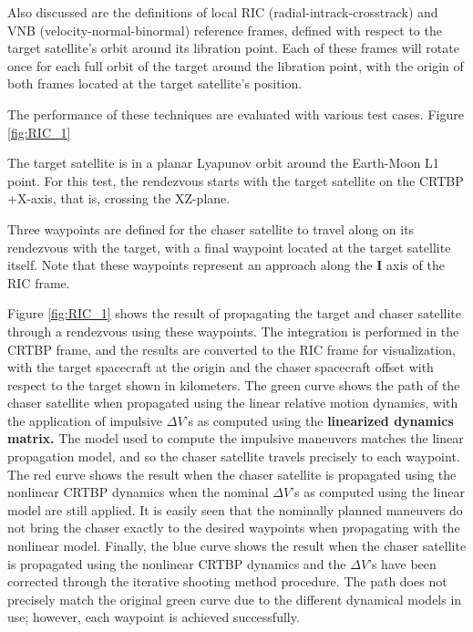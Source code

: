 \documentclass[a4paper]{article}
\begin{document}
Also discussed are the definitions of local RIC (radial-intrack-crosstrack) and VNB (velocity-normal-binormal) reference frames, defined with respect to the target satellite's orbit around its libration point.  Each of these frames will rotate once for each full orbit of the target around the libration point, with the origin of both frames located at the target satellite's position. 

The performance of these techniques are evaluated with various test cases. Figure \ref{fig:RIC_1} 

The target satellite is in a planar Lyapunov orbit around the Earth-Moon L1 point. For this test, the rendezvous starts with the target satellite on the CRTBP +X-axis, that is, crossing the XZ-plane.

Three waypoints are defined for the chaser satellite to travel along on its rendezvous with the target, with a final waypoint located at the target satellite itself.  Note that these waypoints represent an approach along the \(\mathbf{I}\) axis of the RIC frame. 

Figure \ref{fig:RIC_1} shows the result of propagating the target and chaser satellite through a rendezvous using these waypoints.  The integration is performed in the CRTBP frame, and the results are converted to the RIC frame for visualization, with the target spacecraft at the origin and the chaser spacecraft offset with respect to the target shown in kilometers.  The green curve shows the path of the chaser satellite when propagated using the linear relative motion dynamics, with the application of impulsive \(\Delta V\)'s as computed using the \textbf{linearized dynamics matrix.}  The model used to compute the impulsive maneuvers matches the linear propagation model, and so the chaser satellite travels precisely to each waypoint.  The red curve shows the result when the chaser satellite is propagated using the nonlinear CRTBP dynamics when the nominal \(\Delta V\)'s as computed using the linear model are still applied.  It is easily seen that the nominally planned maneuvers do not bring the chaser exactly to the desired waypoints when propagating with the nonlinear model.  Finally, the blue curve shows the result when the chaser satellite is propagated using the nonlinear CRTBP dynamics and the \(\Delta V\)'s have been corrected through the iterative shooting method procedure.  The path does not precisely match the original green curve due to the different dynamical models in use; however, each waypoint is achieved successfully.  %
\end{document}
